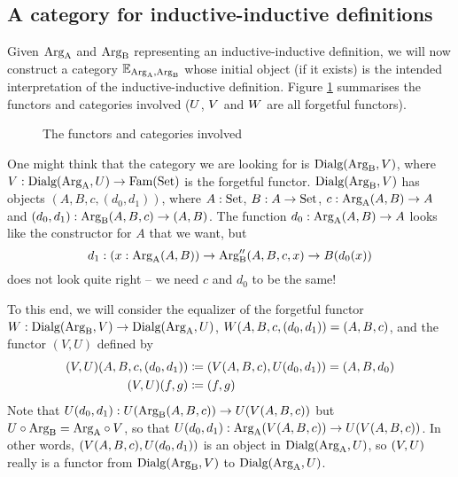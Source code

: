\documentclass[orivec,envcountsame, ,envcountsect]{llncs}
\begin{document}
\subsection{A category for inductive-inductive definitions}

Given $\text{Arg}_{\text{A}}$ and $\text{Arg}_{\text{B}}$ representing an inductive-inductive
definition, we will now construct a category $\mathbb{E}_{\text{Arg}_{\text{A}}, \text{Arg}_{\text{B}}}$
whose initial object (if it exists) is the intended interpretation of
the inductive-inductive definition. Figure \ref{fig:map-of-functors}
summarises the functors and categories involved ($U$,
$V$ and $W$ are all forgetful functors).

\begin{figure}
  \centering
  \caption{The functors and categories involved}
  \label{fig:map-of-functors}
\end{figure}

One might think that the category we are looking for is
$\text{Dialg}(\text{Arg}_{\text{B}}, V)$, where $V :
\text{Dialg}(\text{Arg}_{\text{A}}, U) \to \text{Fam}(\text{Set})$ is the forgetful functor. $\text{Dialg}(\text{Arg}_{\text{B}}, V)$ has
objects $(A, B, c, (d_0, d_1))$, where $A : \text{Set}$, $B : A \to \text{Set}$,
$c : \text{Arg}_{\text{A}}(A, B) \to A$ and $(d_0, d_1) : \text{Arg}_{\text{B}}(A, B, c) \to (A, B)$.
The function $d_0 : \text{Arg}_{\text{A}}(A, B) \to A$ looks like the constructor for
$A$ that we want, but
\[
d_1 : (x : \text{Arg}_{\text{A}}(A, B)) \to \text{Arg}_{\text{B}}''(A, B, c,x) \to B(d_0(x))
\]
does not look quite right -- we need $c$ and $d_0$
to be the same! 

To this end, we will consider the equalizer of the forgetful functor
$W : \text{Dialg}(\text{Arg}_{\text{B}}, V) \to
\text{Dialg}(\text{Arg}_{\text{A}}, U)$, $W(A, B, c, (d_0, d_1)) = (A, B, c)$, and the functor $(V, U)$ defined by 
\begin{align*}
  (V, U)(A, B, c, (d_0, d_1))
     &\coloneqq (V(A, B, c), U(d_0, d_1)) = (A, B, d_0) \\
  (V, U)(f, g)
     &\coloneqq (f, g)
\end{align*}
Note that $U(d_0, d_1) : U(\text{Arg}_{\text{B}}(A, B, c)) \to
U(V(A, B, c))$ but $U \circ \text{Arg}_{\text{B}} = \text{Arg}_{\text{A}}
\circ V$, so that $U(d_0, d_1) :
\text{Arg}_{\text{A}}(V(A, B, c)) \to U(V(A, B, c))$. In
other words, $(V(A, B, c), U(d_0, d_1))$ is an
object in $\text{Dialg}(\text{Arg}_{\text{A}}, U)$, so $(V, U)$
really is a functor from $\text{Dialg}(\text{Arg}_{\text{B}}, V)$ to
$\text{Dialg}(\text{Arg}_{\text{A}}, U)$.
\end{document}
